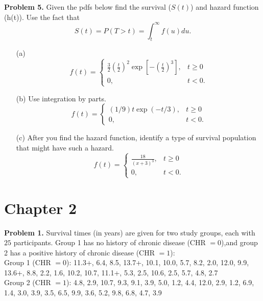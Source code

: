 \documentclass[12pt]{article}
\begin{document}
\textbf{Problem 5.}
Given the pdfs below find the survival ($S(t)$) and hazard function (h(t)). Use the fact that
\[
S(t) = P(T>t) = \int_t^{\infty} f(u) du.
\]

\begin{itemize}
	\item[(a)]
	$$
	f(t) = \begin{cases} \frac{3}{2} (\frac{t}{2})^2 \exp[-(\frac{t}{2})^3], &t\geq 0 \\
		0, &t < 0.
		\end{cases}
	$$
	\item[(b)] Use integration by parts.
	$$
	f(t) = \begin{cases} (1/9)t\exp(-t/3), &t\geq 0 \\
		0, &t < 0.
		\end{cases}
    $$
    \item[(c)] After you find the hazard function, identify a type of survival population that might have such a hazard.
    $$
	f(t) = \begin{cases} \frac{18}{(x+3)^3}, &t\geq 0 \\
		0, &t < 0.
		\end{cases}
    $$
\end{itemize}


\clearpage


\section{Chapter 2}


\textbf{Problem 1.}
Survival times (in years) are given for two study groups, each with $25$ participants. Group 1 has no history of chronic disease (CHR $= 0$),and group 2 has a positive history of chronic disease (CHR $= 1$): \\

Group 1 (CHR $= 0$): 11.3+, 6.4, 8.5, 13.7+, 10.1, 10.0, 5.7, 8.2, 2.0, 12.0, 9.9, 13.6+, 8.8, 2.2, 1.6, 10.2, 10.7, 11.1+, 5.3, 2.5, 10.6, 2.5, 5.7, 4.8, 2.7 \\

Group 2 (CHR $= 1$): 4.8, 2.9, 10.7, 9.3, 9.1, 3.9, 5.0, 1.2, 4.4, 12.0, 2.9, 1.2, 6.9, 1.4, 3.0, 3.9, 3.5, 6.5, 9.9, 3.6, 5.2, 9.8, 6.8, 4.7, 3.9 \\
\end{document}
